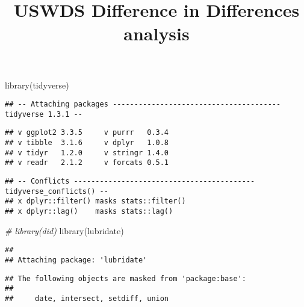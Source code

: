 \documentclass[
]{article}
\title{USWDS Difference in Differences analysis}
\author{}
\date{\vspace{-2.5em}}
\newenvironment{Shaded}{\begin{snugshade}}{\end{snugshade}}
\newcommand{\CommentTok}[1]{\textcolor[rgb]{0.56,0.35,0.01}{\textit{#1}}}
\newcommand{\FunctionTok}[1]{\textcolor[rgb]{0.00,0.00,0.00}{#1}}
\newcommand{\NormalTok}[1]{#1}
\begin{document}
\maketitle

\begin{Shaded}
\begin{Highlighting}[]
\FunctionTok{library}\NormalTok{(tidyverse)}
\end{Highlighting}
\end{Shaded}

\begin{verbatim}
## -- Attaching packages --------------------------------------- tidyverse 1.3.1 --
\end{verbatim}

\begin{verbatim}
## v ggplot2 3.3.5     v purrr   0.3.4
## v tibble  3.1.6     v dplyr   1.0.8
## v tidyr   1.2.0     v stringr 1.4.0
## v readr   2.1.2     v forcats 0.5.1
\end{verbatim}

\begin{verbatim}
## -- Conflicts ------------------------------------------ tidyverse_conflicts() --
## x dplyr::filter() masks stats::filter()
## x dplyr::lag()    masks stats::lag()
\end{verbatim}

\begin{Shaded}
\begin{Highlighting}[]
\CommentTok{\# library(did)}
\FunctionTok{library}\NormalTok{(lubridate)}
\end{Highlighting}
\end{Shaded}

\begin{verbatim}
## 
## Attaching package: 'lubridate'
\end{verbatim}

\begin{verbatim}
## The following objects are masked from 'package:base':
## 
##     date, intersect, setdiff, union
\end{verbatim}
\end{document}
